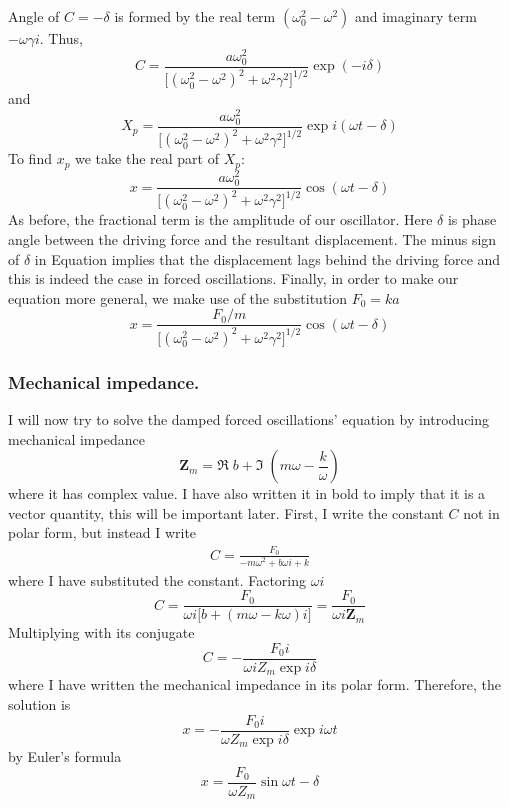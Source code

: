 \documentclass[../../../main.tex]{subfiles}
\begin{document}
Angle of $C=-\delta$ is formed by the real term $(\omega_0^2-\omega^2)$ and imaginary term $-\omega\gamma i$. Thus,
\begin{equation*}
    C=\frac{a\omega_0^2 }{\big[(\omega_0^2- \omega^2)^2 +\omega^2\gamma^2\big]^{1/2} }\exp (-i\delta )
\end{equation*}
and 
\begin{equation*}
    X_p=\frac{a\omega_0^2 }{\big[(\omega_0^2- \omega^2)^2 +\omega^2\gamma^2\big]^{1/2} }\exp i(\omega t-\delta )
\end{equation*}
To find $x_p$ we take the real part of $X_p$:
\begin{equation*}
    x=\frac{a\omega_0^2 }{\big[(\omega_0^2- \omega^2)^2 +\omega^2\gamma^2\big]^{1/2} }\cos (\omega t-\delta )
\end{equation*}
As before, the fractional term is the amplitude of our oscillator. Here $\delta $ is phase angle between the driving force and the resultant displacement. The minus sign of $\delta $ in Equation implies that the displacement lags behind the driving force and this is indeed the case in forced oscillations. Finally, in order to make our equation more general, we make use of the substitution $F_0 = ka$
\begin{equation*}
    x=\frac{F_0/m }{\big[(\omega_0^2- \omega^2)^2 +\omega^2\gamma^2\big]^{1/2} }\cos (\omega t-\delta )
\end{equation*}
\subsubsection*{Mechanical impedance.} I will now try to solve the damped forced oscillations' equation by introducing mechanical impedance
\begin{equation*}
    \mathbf{Z}_m= \Re \;b+\Im\; (m\omega- \frac{k}{\omega}) 
\end{equation*}
where it has complex value. I have also written it in bold to imply that it is a vector quantity, this will be important later. First, I write the constant $C$ not in polar form, but instead I write
\begin{align*}
    C=\frac{F_0}{-m\omega^2+b\omega i+k}
\end{align*}
where I have substituted the constant. Factoring $\omega i$
\begin{equation*}
    C=\frac{F_0}{\omega i \big[b+(m\omega-k\omega)i\big]}=\frac{F_0}{\omega i\mathbf{Z}_m}
\end{equation*}
Multiplying with its conjugate
\begin{equation*}
    C=-\frac{F_0i}{\omega i Z_m\exp i\delta}
\end{equation*}
where I have written the mechanical impedance in its polar form. Therefore, the solution is
\begin{equation*}
    x=-\frac{F_0i}{\omega Z_m\exp i\delta}\exp i\omega t
\end{equation*}
by Euler's formula
\begin{equation*}
    x=\frac{F_0 }{\omega Z_m}\sin \omega t-\delta
\end{equation*}
\end{document}
